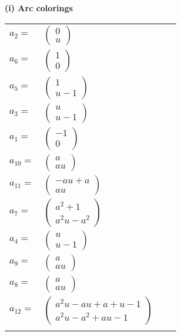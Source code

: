 \documentclass[1p]{elsarticle_modified}
\theoremstyle{definition}
\begin{document}
\flushleft \textbf{(i) Arc colorings}\\
\begin{tabular}{m{7pt} m{180pt} m{7pt} m{180pt} }
\flushright $a_{2}=$&$\begin{pmatrix}0\\u\end{pmatrix}$ \\
\flushright $a_{6}=$&$\begin{pmatrix}1\\0\end{pmatrix}$ \\
\flushright $a_{5}=$&$\begin{pmatrix}1\\u-1\end{pmatrix}$ \\
\flushright $a_{3}=$&$\begin{pmatrix}u\\u-1\end{pmatrix}$ \\
\flushright $a_{1}=$&$\begin{pmatrix}-1\\0\end{pmatrix}$ \\
\flushright $a_{10}=$&$\begin{pmatrix}a\\a u\end{pmatrix}$ \\
\flushright $a_{11}=$&$\begin{pmatrix}- a u+a\\a u\end{pmatrix}$ \\
\flushright $a_{7}=$&$\begin{pmatrix}a^2+1\\a^2 u- a^2\end{pmatrix}$ \\
\flushright $a_{4}=$&$\begin{pmatrix}u\\u-1\end{pmatrix}$ \\
\flushright $a_{9}=$&$\begin{pmatrix}a\\a u\end{pmatrix}$ \\
\flushright $a_{8}=$&$\begin{pmatrix}a\\a u\end{pmatrix}$ \\
\flushright $a_{12}=$&$\begin{pmatrix}a^2 u- a u+a+u-1\\a^2 u- a^2+a u-1\end{pmatrix}$\\&\end{tabular}
\end{document}
